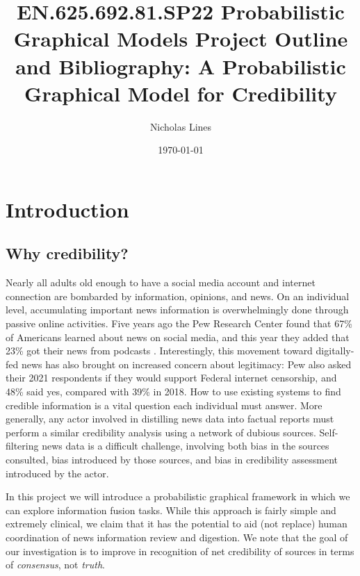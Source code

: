 \documentclass{amsart}
\theoremstyle{definition}
\theoremstyle{plain}
\numberwithin{equation}{section}
\begin{document}
\title[Credibility Project Outline]{EN.625.692.81.SP22 Probabilistic
Graphical Models Project Outline and Bibliography: A Probabilistic Graphical
Model for Credibility}
\author{Nicholas Lines}
\date{\today }
\maketitle

\section{Introduction}

\subsection{Why credibility?}

Nearly all adults old enough to have a social media account and internet
connection are bombarded by information, opinions, and news. On an
individual level, accumulating important news information is overwhelmingly
done through passive online activities. Five years ago the Pew Research
Center found that 67\% of Americans learned about news on social media, and
this year they added that 23\% got their news from podcasts \cite%
{gottfried2019news}\cite{walker2022nearly}. Interestingly, this movement
toward digitally-fed news has also brought on increased concern about
legitimacy: Pew also asked their 2021 respondents if they would support
Federal internet censorship, and 48\% said yes, compared with 39\% in 2018.
How to use existing systems to find credible information is a vital question
each individual must answer. More generally, any actor involved in
distilling news data into factual reports must perform a similar credibility
analysis using a network of dubious sources. Self-filtering news data is a
difficult challenge, involving both bias in the sources consulted, bias
introduced by those sources, and bias in credibility assessment introduced
by the actor. 

In this project we will introduce a probabilistic graphical framework in
which we can explore information fusion tasks. While this approach is fairly
simple and extremely clinical, we claim that it has the potential to aid
(not replace) human coordination of news information review and digestion.
We note that the goal of our investigation is to improve in recognition of
net credibility of sources in terms of \emph{consensus}, not \emph{truth}. 
\end{document}
